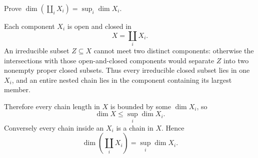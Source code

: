\begin{problem}\label{prob:vi30-15}
Prove \(\dim(\coprod_iX_i)=\sup_i\dim X_i\).

\end{problem}

\ifdefined\FullProblemDossiers
\begin{solution}
Each component \(X_i\) is open and closed in
\[
X=\coprod_iX_i.
\]
An irreducible subset \(Z\subseteq X\) cannot meet two distinct components: otherwise the intersections with those
open-and-closed components would separate \(Z\) into two nonempty proper closed subsets. Thus every irreducible
closed subset lies in one \(X_i\), and an entire nested chain lies in the component containing its largest member.

Therefore every chain length in \(X\) is bounded by some \(\dim X_i\), so
\[
\dim X\le\sup_i\dim X_i.
\]
Conversely every chain inside an \(X_i\) is a chain in \(X\). Hence
\[
\boxed{
\dim\left(\coprod_iX_i\right)=\sup_i\dim X_i.
}
\]
\end{solution}
\fi

